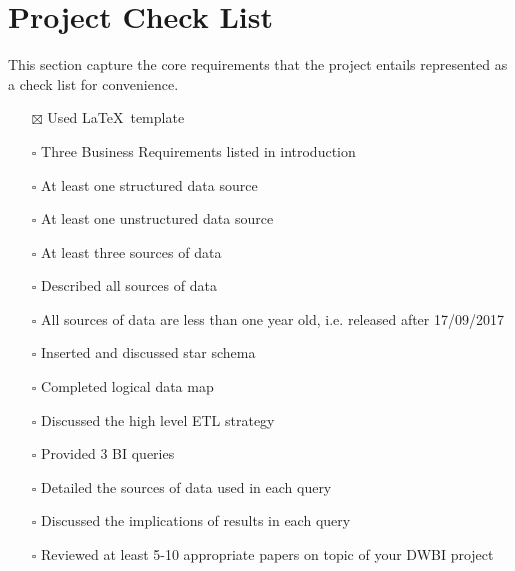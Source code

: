 \section*{Project Check List}

This section capture the core requirements that the project entails represented as a check list for convenience.



\begin{itemize}
\item[$\boxtimes$] Used \LaTeX \ template
\item[$\square$] Three Business Requirements listed in introduction
\item[$\square$] At least one structured data source
\item[$\square$] At least one unstructured data source
\item[$\square$] At least three sources of data
\item[$\square$] Described all sources of data
\item[$\square$] All sources of data are less than one year old, i.e. released after 17/09/2017 
\item[$\square$] Inserted and discussed star schema
\item[$\square$] Completed logical data map
\item[$\square$] Discussed the high level ETL strategy
\item[$\square$] Provided 3 BI queries
\item[$\square$] Detailed the sources of data used in each query
\item[$\square$] Discussed the implications of results in each query
\item[$\square$] Reviewed at least 5-10 appropriate papers on topic of your DWBI project

\end{itemize}
